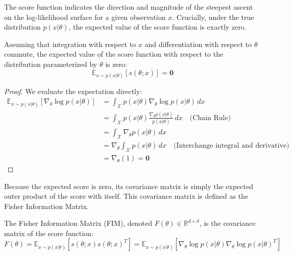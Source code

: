 The score function indicates the direction and magnitude of the steepest ascent on the log-likelihood surface for a given observation $x$. Crucially, under the true distribution $p(x|\theta)$, the expected value of the score function is exactly zero.

\begin{theorem}
\label{thm:zero_mean_score}
Assuming that integration with respect to $x$ and differentiation with respect to $\theta$ commute, the expected value of the score function with respect to the distribution parameterized by $\theta$ is zero:
\begin{equation}
    \mathbb{E}_{x \sim p(x|\theta)}[s(\theta; x)] = \mathbf{0}
\end{equation}
\end{theorem}
\begin{proof}
We evaluate the expectation directly:
\begin{align*}
    \mathbb{E}_{x \sim p(x|\theta)}[\nabla_\theta \log p(x|\theta)] &= \int_{\mathcal{X}} p(x|\theta) \nabla_\theta \log p(x|\theta) \, dx \\
    &= \int_{\mathcal{X}} p(x|\theta) \frac{\nabla_\theta p(x|\theta)}{p(x|\theta)} \, dx \quad \text{(Chain Rule)} \\
    &= \int_{\mathcal{X}} \nabla_\theta p(x|\theta) \, dx \\
    &= \nabla_\theta \int_{\mathcal{X}} p(x|\theta) \, dx \quad \text{(Interchange integral and derivative)} \\
    &= \nabla_\theta (1) = \mathbf{0}
\end{align*}
\end{proof}

Because the expected score is zero, its covariance matrix is simply the expected outer product of the score with itself. This covariance matrix is defined as the Fisher Information Matrix.

\begin{definition}
The Fisher Information Matrix (FIM), denoted $F(\theta) \in \mathbb{R}^{d \times d}$, is the covariance matrix of the score function:
\begin{equation}
    F(\theta) = \mathbb{E}_{x \sim p(x|\theta)}\left[ s(\theta; x) s(\theta; x)^T \right] = \mathbb{E}_{x \sim p(x|\theta)}\left[ \nabla_\theta \log p(x|\theta) \nabla_\theta \log p(x|\theta)^T \right]
\end{equation}
\end{definition}

